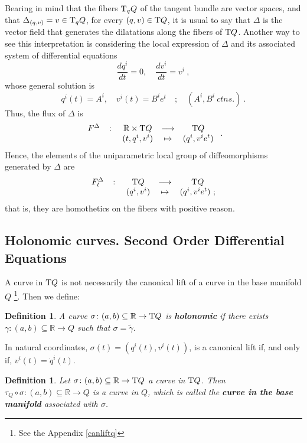 \documentclass[12pt]{report}
\newtheorem{definition}[teor]{Definition}
\def\Real{\mathbb{R}}
\def\Tan{{\rm T}}
\begin{document}
Bearing in mind that the fibers $\Tan_qQ$ of the
tangent bundle are vector spaces, and that
$\Delta_{(q,v)}=v\in\Tan_qQ$, for every $(q,v)\in\Tan Q$, 
it is usual to say that $\Delta$ is the vector field that generates
the dilatations along the fibers of $\Tan Q$.
Another way to see this interpretation is considering the local
expression of $\Delta$ and its associated system of differential equations
$$
\frac{d q^i}{d t}=0 ,\quad
\frac{d v^i}{d t}=v^i \ ,
$$
whose general solution is
$$
q^i(t)=A^i ,\quad
v^i(t)=B^ie^t \quad ;\quad (A^i,B^i \ ctns.) \ .
$$
Thus, the flux of $\Delta$ is
$$
\begin{array}{ccccc}
F^\Delta&\colon&\Real\times\Tan Q&\longrightarrow&\Tan Q \\
 & & (t,q^i,v^i) & \mapsto & (q^i,v^ie^t) 
\end{array} \ .
$$
Hence, the elements of the uniparametric local group of diffeomorphisms generated by $\Delta$ are
$$
\begin{array}{ccccc}
F^\Delta_t&\colon&\Tan Q&\longrightarrow&\Tan Q \\
 & & (q^i,v^i) & \mapsto & (q^i,v^ie^t) \ ;
\end{array}
$$
that is, they are homothetics on the fibers with positive reason.


\subsection{Holonomic curves. Second Order Differential Equations}


A curve in $\Tan Q$ is not necessarily the canonical lift
of a curve in the base manifold $Q$
\footnote{
See the Appendix \ref{canliftq}}. 
Then we define:

\begin{definition}
A curve $\sigma\colon (a,b)\subseteq\Real\to\Tan Q$ is
\textbf{holonomic} if there exists $\gamma\colon (a,b)\subseteq\Real\to Q$
such that $\sigma=\widetilde\gamma$.
\end{definition}

In natural coordinates, $\sigma(t)=(q^i(t),v^i(t))$,
is a canonical lift if, and only if,
$v^i(t)=\dot q^i(t)$.
 
\begin{definition}
Let $\sigma\colon (a,b)\subseteq\Real\to\Tan Q$ a curve
in $\Tan Q$. Then $\tau_Q\circ\sigma\colon (a,b)\subseteq\Real\to Q$
is a curve in $Q$, which is called the
\textbf{curve in the base manifold} associated with $\sigma$.
\end{definition}
\end{document}
